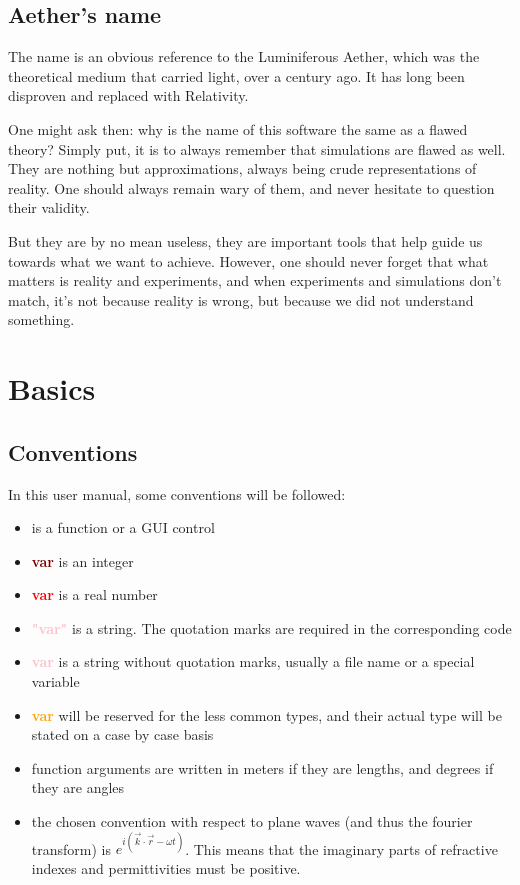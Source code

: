 \documentclass[a4paper,11pt]{book}
\newcommand{\lfc}[1]{\textbf{\color{blue}{#1}}}
\newcommand{\lin}[1]{\textbf{\textcolor{Maroon}{#1}}}
\newcommand{\lft}[1]{\textbf{\textcolor{red}{#1}}}
\newcommand{\lsg}[1]{\textbf{\textcolor{pink}{"#1"}}}
\newcommand{\lsgnq}[1]{\textbf{\textcolor{pink}{#1}}}
\newcommand{\lud}[1]{\textbf{\textcolor{orange}{#1}}}
\begin{document}
\section{Aether's name}

The name is an obvious reference to the Luminiferous Aether, which was the theoretical medium that carried light, over a century ago. It has long been disproven and replaced with Relativity.

One might ask then: why is the name of this software the same as a flawed theory? Simply put, it is to always remember that simulations are flawed as well. They are nothing but approximations, always being crude representations of reality. One should always remain wary of them, and never hesitate to question their validity.

But they are by no mean useless, they are important tools that help guide us towards what we want to achieve. However, one should never forget that what matters is reality and experiments, and when experiments and simulations don't match, it's not because reality is wrong, but because we did not understand something.

\chapter{Basics}

\section{Conventions}

In this user manual, some conventions will be followed:
\begin{itemize}
	\item \lfc{var} is a function or a GUI control
	\item \lin{var} is an integer
	\item \lft{var} is a real number
	\item \lsg{var} is a string. The quotation marks are required in the corresponding code
	\item \lsgnq{var} is a string without quotation marks, usually a file name or a special variable
	\item \lud{var} will be reserved for the less common types, and their actual type will be stated on a case by case basis
	\item function arguments are written in meters if they are lengths, and degrees if they are angles
	\item the chosen convention with respect to plane waves (and thus the fourier transform) is $e^{\displaystyle i(\vec k\cdot \vec r-\omega t)}$. This means that the imaginary parts of refractive indexes and permittivities must be positive.
\end{itemize}
\end{document}
